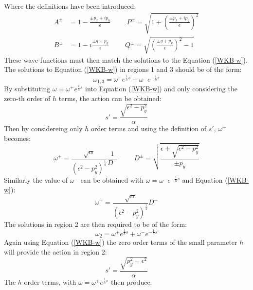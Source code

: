 		Where the definitions have been introduced:
		\begin{align}
			A^{\pm}&=1-\frac{\pm p_{x}+ip_{y}}{\epsilon}
			\hspace{1cm}
			P^{\pm}=\sqrt{1+\left(\frac{\pm p_{x}+ip_{y}}{\epsilon}\right)^{2}}\\
			B^{\pm}&=1-i\frac{\pm q+p_{y}}{\epsilon}
			\hspace{1cm}
			Q^{\pm}=\sqrt{\left(\frac{\pm q+p_{y}}{\epsilon}\right)^{2}-1}
		\end{align}
		These wave-functions must then match the solutions to the Equation (\ref{WKB-w}). The solutions to Equation (\ref{WKB-w}) in regions 1 and 3 should be of the form:
		\begin{equation}
			\omega_{1,3}=\omega^{+}e^{\frac{i}{h}s}+\omega^{-}e^{-\frac{i}{h}s}
		\end{equation}
		By substituting $\omega=\omega^{+}e^{\frac{i}{h}s}$ into Equation (\ref{WKB-w}) and only considering the zero-th order of $h$ terms, the action can be obtained:
		\begin{equation}
			s'=\frac{\sqrt{\epsilon^{2}-p_{y}^{2}}}{\alpha}
		\end{equation}
		Then by considereing only $h$ order terms and using the definition of $s'$, $\omega^{+}$ becomes:
		\begin{equation}
			\omega^{+}=\frac{\sqrt{\alpha}}{\left(\epsilon^{2}-p_{y}^{2}\right)^{\frac{1}{4}}}\frac{1}{D^{-}}
			\hspace{1cm}
			D^{\pm}=\sqrt{\frac{\epsilon+\sqrt{\epsilon^{2}-p_{y}^{2}}}{\pm p_{y}}}
		\end{equation}
		Similarly the value of $\omega^{-}$ can be obtained with $\omega=\omega^{-}e^{-\frac{i}{h}s}$ and Equation (\ref{WKB-w}):
		\begin{equation}
			\omega^{-}=\frac{\sqrt{\alpha}}{\left(\epsilon^{2}-p_{y}^{2}\right)^{\frac{1}{4}}}D^{-}
		\end{equation}
		The solutions in region 2 are then required to be of the form:
		\begin{equation}
			\omega_{2}=\omega^{+}e^{\frac{1}{h}s}+\omega^{-}e^{-\frac{1}{h}s}
		\end{equation}
		Again using Equation (\ref{WKB-w}) the zero order terms of the small parameter $h$ will provide the action in region 2:
		\begin{equation}
			s'=\frac{\sqrt{p_{y}^{2}-\epsilon^{2}}}{\alpha}
		\end{equation}
		The $h$ order terms, with $\omega=\omega^{+}e^{\frac{1}{h}s}$ then produce:
